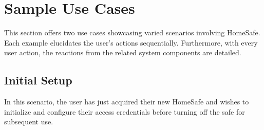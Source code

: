 \documentclass{article}
\begin{document}
\section{Sample Use Cases}
This section offers two use cases showcasing varied scenarios involving HomeSafe. Each example elucidates the user's actions sequentially. Furthermore, with every user action, the reactions from the related system components are detailed.

\subsection{Initial Setup}
In this scenario, the user has just acquired their new HomeSafe and wishes to initialize and configure their access credentials before turning off the safe for subsequent use.
\end{document}
